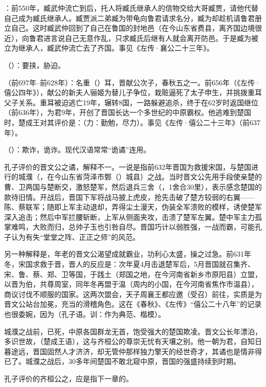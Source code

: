 {
\item {}：前550年，臧武仲流亡到后，托人将臧氏继承人的信物交给大哥臧贾，请他代替自己成为臧氏继承人。臧贾派二弟臧为带龟向鲁君请求名分，臧为却趁机请鲁君册立自己。这时臧武仲回到了自己在鲁国的封地邑（在今山东省费县，离齐国边境很近），向鲁君进言说自己无意作乱，只求臧氏后继有人就会离开防邑。于是臧为被立为继承人，臧武仲流亡去了齐国。事见《左传·襄公二十三年》。
\item {}（）：要挟，胁迫。
}
{}


{
\item {}（前697年--前628年）：名重（）耳，晋献公次子，春秋五之一。前656年（《左传·僖公四年》），献公的新夫人骊姬为替儿子争位，栽赃逼死了太子申生，并挑拨重耳父子关系。重耳被迫逃亡19年，辗转8国，一路躲避追杀，终于在62岁时返国继位（前636年），为君9年，开创了晋国长达一个多世纪的中原霸权。他逃难到楚国时，楚成王对其评价是：（力：勤勉，尽力）。事见《左传·僖公二十三年》（前637年）。

\item {}（）：欺诈，诡诈。现代汉语常常“诡谲”连用。

孔子评价的晋文公之谲，解释不一。一说是指前632年晋国为救援宋国，与楚国进行的城濮（，在今山东省菏泽市鄄（）城县）之战。当时晋文公先用手段使亲楚的曹、卫两国与楚断交，激怒楚军，然后退兵三舍（，1舍合30里），表示感念楚国的款待旧情。开战后，晋国下军将战马披上虎皮，抢先击破了楚方较弱的右翼——陈、蔡联军；随即上军主动退却，弄得尘土漫天，伪装全军溃败的模样，诱使楚军深入追击；然后中军拦腰斩断，上军从侧面夹攻，击溃了楚军左翼。楚中军主力孤掌难鸣，大败而归，总帅子玉也引咎自尽。晋国巧计以弱胜强，一战而霸，可能孔子认为有失“堂堂之阵、正正之师”的风范。

另一种解释是，年老的晋文公渴望成就霸业，功利心太盛，操之过急。前631年冬，宋国求救于晋，晋人的反应是：次年夏4月击退楚军后，5月晋国就召集齐、宋、鲁、蔡、郑、卫等国，于践土（郑国之地，在今河南省新乡市原阳县）立盟，以晋为伯，共尊周室，同年冬再盟于温（周内的小国，在今河南省焦作市温县），商议讨伐不顺服的国家。这两次盟会，天子周襄王都应邀（受召）前往，实质是为晋文公站台加冕，充当的滑稽角色。这在《春秋》、《左传》“僖公二十八年”的记录也很委婉，因为（孔子语。训：作为典范、楷模）。

城濮之战前，已死，中原各国群龙无首，饱受强大的楚国欺凌。晋文公长年漂泊，多识世故，（楚成王语），这与齐桓公的尊崇无忧有天壤之别。他一朝为君，自知日暮途远，晋国固然人才济济，却无管仲那样独力擎天的经世奇才，其谲也是情非得已了。城濮之战后，30多年间楚国不敢北窥中原，晋国的强盛持续到时期。

\item 孔子评价的齐桓公之，应是指下一章的。
}
